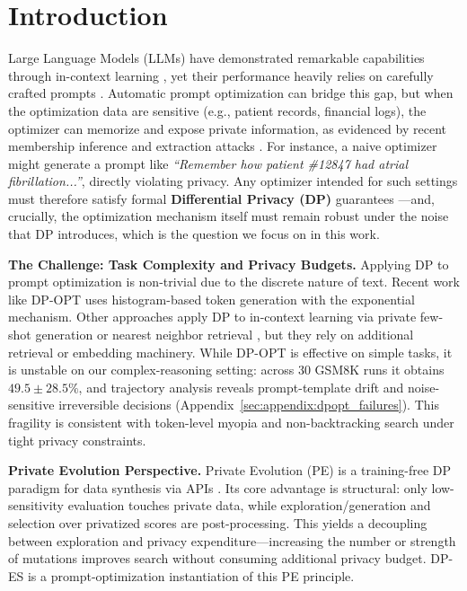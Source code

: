 \section{Introduction}
\label{sec:introduction}

Large Language Models (LLMs) have demonstrated remarkable capabilities through in-context learning \cite{brown2020language,ouyang2022training}, yet their performance heavily relies on carefully crafted prompts \cite{liu2023pre}. Automatic prompt optimization \cite{yuksekgonul2024textgrad,yang2023large} can bridge this gap, but when the optimization data are sensitive (e.g., patient records, financial logs), the optimizer can memorize and expose private information, as evidenced by recent membership inference and extraction attacks \cite{wang2024decodingtrust,rahman2024sok,fu2023practical}. For instance, a naive optimizer might generate a prompt like \textit{``Remember how patient \#12847 had atrial fibrillation...''}, directly violating privacy. Any optimizer intended for such settings must therefore satisfy formal \textbf{Differential Privacy (DP)} guarantees \cite{dwork2006calibrating}---and, crucially, the optimization mechanism itself must remain robust under the noise that DP introduces, which is the question we focus on in this work.

\noindent\textbf{The Challenge: Task Complexity and Privacy Budgets.}
Applying DP to prompt optimization is non-trivial due to the discrete nature of text. Recent work like DP-OPT \cite{hong2024dpopt} uses histogram-based token generation with the exponential mechanism. Other approaches apply DP to in-context learning via private few-shot generation or nearest neighbor retrieval \cite{tang2024privacy,koskela2025differentially}, but they rely on additional retrieval or embedding machinery. While DP-OPT is effective on simple tasks, it is unstable on our complex-reasoning setting: across 30 GSM8K runs it obtains $49.5{\pm}28.5\%$, and trajectory analysis reveals prompt-template drift and noise-sensitive irreversible decisions (Appendix~\ref{sec:appendix:dpopt_failures}). This fragility is consistent with token-level myopia and non-backtracking search under tight privacy constraints.

\noindent\textbf{Private Evolution Perspective.}
Private Evolution (PE) is a training-free DP paradigm for data synthesis via APIs \cite{lin2024dpsda_images,xie2024dpsda_text,lin2025simpe}. Its core advantage is structural: only low-sensitivity evaluation touches private data, while exploration/generation and selection over privatized scores are post-processing. This yields a decoupling between exploration and privacy expenditure---increasing the number or strength of mutations improves search without consuming additional privacy budget. DP-ES is a prompt-optimization instantiation of this PE principle.


